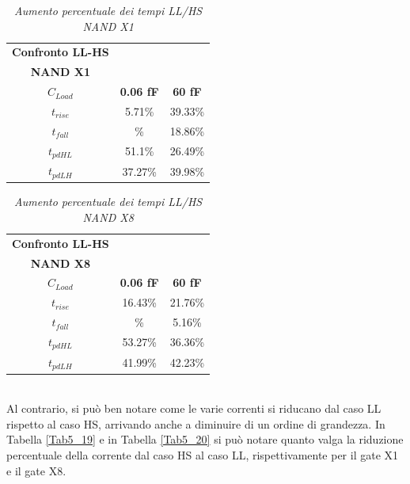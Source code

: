 \begin{table}[!h]\footnotesize
	\centering
	\begin{tabular}{|c|c|c|}
		\hline
		\textbf{Confronto LL-HS} & &\\
		\textbf{NAND X1} & &\\
		\textbf{$C_{Load}$} & \textbf{0.06 fF} & \textbf{60 fF}\\
		\hline
		$t_{rise}$ &5.71\% &39.33\%  \\
		
		$t_{fall}$ &\% & 18.86\%  \\
		
		$t_{pdHL}$&51.1\% & 26.49\%  \\
		
		$t_{pdLH}$&37.27\%& 39.98\% \\
		\hline
	\end{tabular}
	\caption{\textit{Aumento percentuale dei tempi LL/HS NAND X1}}
	\label{Tab5_17}
\end{table}
\begin{table}[!h]\footnotesize
	\centering
	\begin{tabular}{|c|c|c|}
		\hline
		\textbf{Confronto LL-HS} & &\\
		\textbf{NAND X8} & &\\
		\textbf{$C_{Load}$} & \textbf{0.06 fF} & \textbf{60 fF}\\
		\hline
		$t_{rise}$ &16.43\% &21.76\%  \\
		
		$t_{fall}$ &\% & 5.16\%  \\
		
		$t_{pdHL}$&53.27\% &36.36\%  \\
		
		$t_{pdLH}$&41.99\%& 42.23\% \\
		\hline
	\end{tabular}
	\caption{\textit{Aumento percentuale dei tempi LL/HS NAND X8}}
	\label{Tab5_18}
\end{table}
\\
Al contrario, si può ben notare come le varie correnti si riducano dal caso LL rispetto al caso HS, arrivando anche a diminuire di un ordine di grandezza. In Tabella \ref{Tab5_19} e in Tabella \ref{Tab5_20} si può notare quanto valga la riduzione percentuale della corrente dal caso HS al caso LL, rispettivamente per il gate X1 e il gate X8.
